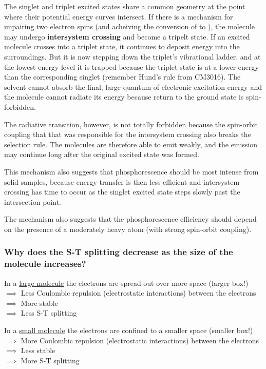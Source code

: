 \documentclass[ignorenonframetext]{beamer}
\begin{document}
The singlet and triplet excited states share a common geometry at the point where their potential energy curves intersect. If there is a mechanism for unpairing two electron spins (and acheiving the conversion of  to \ce{ ^ ^}), the molecule may undergo \textbf{intersystem crossing} and become a tripelt state. If an excited molecule crosses into a triplet state, it continues to deposit energy into the surroundings. But it is now stepping down the triplet's vibrational ladder, and at the lowest energy level it is trapped because the triplet state is at a lower energy than the corresponding singlet (remember Hund's rule from CM3016). The solvent cannot absorb the final, large quantum of electronic excitation energy and the molecule cannot radiate its energy because return to the ground state is spin-forbidden.

The radiative transition, however, is not totally forbidden because the spin-orbit coupling that that was responsible for the intersystem crossing also breaks the selection rule. The molecules are therefore able to emit weakly, and the emission may continue long after the original excited state was formed.

This mechanism also suggests that phosphorescence should be most intense from solid samples, because energy transfer is then less efficient and intersystem crossing has time to occur as the singlet excited state steps slowly past the intersection point.

The mechanism also suggests that the phosphorescence efficiency should depend on the presence of a moderately heavy atom (with strong spin-orbit coupling).

\begin{frame}
\frametitle{Why does the S-T splitting decrease as the size of the molecule increases?}
In a \underline{large molecule} the electrons are spread out over more space (larger box!)\\
\hspace{5pt} \(\implies\) Less Coulombic repulsion (electrostatic interactions) between the electrons\\
\hspace{10pt} \(\implies\) More stable \\
\hspace{15pt} \(\implies\) Less S-T splitting\\
\medskip

In a \underline{small molecule} the electrons are confined to a smaller space (smaller box!)\\
\hspace{5pt} \(\implies\) More Coulombic repulsion (electrostatic interactions) between the electrons\\
\hspace{10pt} \(\implies\) Less stable\\
\hspace{15pt} \(\implies\) More S-T splitting
\end{frame}
\end{document}
